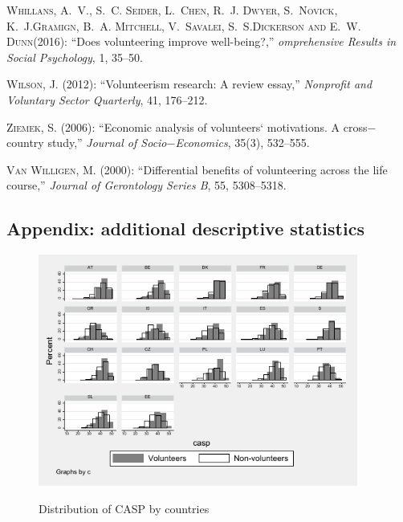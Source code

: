 \documentclass[10pt, letterpaper]{article}
\begin{document}
\begin{spacing}{1.4}
\begin{thebibliography}{87}
\textsc{Whillans, A.~V., S.~C. Seider, L.~Chen, R.~J. Dwyer, S.~Novick, K.~J.Gramign, B.~A. Mitchell, V.~Savalei, S.~S.Dickerson and E.~W. Dunn}(2016):
  \enquote{Does volunteering improve well-being?,} \emph{omprehensive Results in Social Psychology}, 1, 35--50.

  
\textsc{Wilson, J.} (2012): \enquote{Volunteerism research: A
  review essay,} \emph{Nonprofit and Voluntary Sector Quarterly}, 41, 176--212.

\textsc{Ziemek, S.} (2006): \enquote{Economic analysis of volunteers` motivations. A cross$-$country study,} \emph{Journal of Socio$-$Economics}, 35(3), 532--555.


\textsc{Van Willigen, M.} (2000): \enquote{Differential benefits of volunteering across the life course,} \emph{Journal of Gerontology Series B}, 55, 5308--5318.


\end{thebibliography}


\begin{spacing}{.9}

\section{Appendix: additional descriptive statistics}


\begin{figure}[H]
 \includegraphics[height=3in]{hist_casp.pdf}
 \centering
 \label{fig:hist_casp}
\caption{Distribution of CASP by countries}
\end{figure}


\end{spacing}
\end{spacing}
\end{document}
